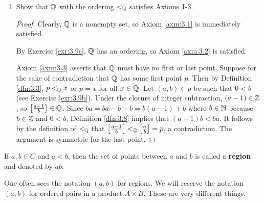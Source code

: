 \documentclass[../main.tex]{subfiles}
\begin{document}
\begin{exercise}
\begin{enumerate}[label={\alph*)},ref={\thetheorem\alph*}]
\begin{proof}
            To prove that $\lQ$ is transitive, it will suffice to show that for all $p,q,r\in\Q$, if $p\lQ q$ and $q\lQ r$, then $p\lQ r$. Let $p,q,r$ be arbitrary elements of $\Q$ for which it is true that $p\lQ q$ and $q\lQ r$, let $(a,b)\in p$ be such that $0<b$, let $(c,d)\in q$ be such that $0<d$, and let $(e,f)\in r$ such that $0<f$. By the definition of $\lQ$, we have $ad<bc$ and $cf<de$. Since $0<f$ and $0<b$, we can multiply both sides of the inequalities by $b$ or $f$ without affecting the truth of the statement (see Script \ref{sct:0}). Thus, we may create the inequalities $adf<bcf$ and $bcf<bde$. So $adf<bde$ by Definition \ref{dfn:3.1}, implying that $af<be$ by the cancellation law (which we may use since $0<d$). It follows by the definition of $\lQ$ that $p\lQ r$.
        \end{proof}
        \item \label{exr:3.9d}Show that $\Q$ with the ordering $\lQ$ satisfies Axioms 1-3.
        \begin{proof}
            Clearly, $\Q$ is a nonempty set, so Axiom \ref{axm:3.1} is immediately satisfied.\par
            By Exercise \ref{exr:3.9c}, $\Q$ has an ordering, so Axiom \ref{axm:3.2} is satisfied.\par
            Axiom \ref{axm:3.3} asserts that $\Q$ must have no first or last point. Suppose for the sake of contradiction that $\Q$ has some first point $p$. Then by Definition \ref{dfn:3.3}, $p<_{\mathbb{Q}} x$ or $p=x$ for all $x\in\mathbb{Q}$. Let $(a,b)\in p$ be such that $0<b$ (see Exercise \ref{exr:3.9b}). Under the closure of integer subtraction, $(a-1)\in\mathbb{Z}$, so $\left[ \frac{a-1}{b} \right]\in\mathbb{Q}$. Since $ba=ba-b+b=b(a-1)+b$ where $b\in\mathbb{N}$ because $b\in\mathbb{Z}$ and $0<b$, Definition \ref{dfn:3.8} implies that $(a-1)b<ba$. It follows by the definition of $\lQ$ that $\left[ \frac{a-1}{b} \right]<_{\mathbb{Q}}\left[ \frac{a}{b} \right]=p$, a contradiction. The argument is symmetric for the last point.
        \end{proof}
    \end{enumerate}
\end{exercise}

\begin{definition}\label{dfn:3.10}
    If $a,b\in C$ and $a<b$, then the set of points between $a$ and $b$ is called a \textbf{region} and denoted by $\underline{ab}$.
\end{definition}

\begin{remark}\label{rmk:3.11}
    One often sees the notation $(a,b)$ for regions. We will reserve the notation $(a,b)$ for ordered pairs in a product $A\times B$. These are very different things.
\end{remark}
\end{document}
